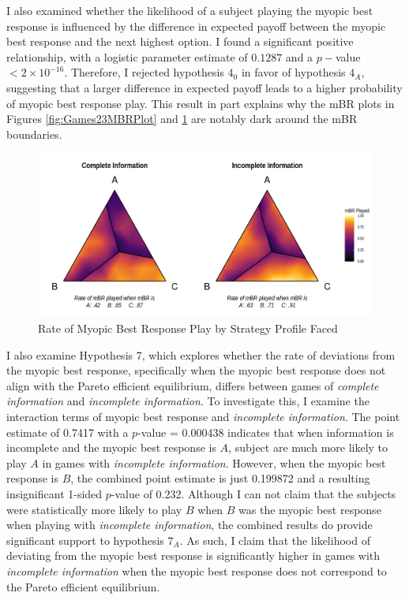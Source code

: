 I also examined whether the likelihood of a subject playing the myopic best response is influenced by the difference in expected payoff between the myopic best response and the next highest option. 
I found a significant positive relationship, with a logistic parameter estimate of 
$0.1287$ and a $p-$value $<2 \times 10^{-16}$. Therefore, I rejected hypothesis $4_0$ in favor of hypothesis $4_A$, suggesting that a larger difference in expected payoff leads to a higher probability of myopic best response play. This result in part explains why the mBR plots in Figures \ref{fig:Games23MBRPlot} and \ref{fig:GamesCIMBRPlot} are notably dark around the mBR boundaries.


\begin{figure}[h]
\captionsetup{justification=centering}
  \caption{Rate of Myopic Best Response Play by Strategy Profile Faced}
   \label{fig:GamesCIMBRPlot}
    \includegraphics[width = \textwidth]{Images/GamesCIMBRPlot.png}
\end{figure}

I also examine Hypothesis 7, which explores whether the rate of deviations from the myopic best response, specifically when the myopic best response does not align with the Pareto efficient equilibrium, differs between games of \textit{complete information} and \textit{incomplete information}. To investigate this, I examine the interaction terms of myopic best response and \textit{incomplete information}. The point estimate of 0.7417 with a $p$-value = 0.000438 indicates that when information is incomplete and the myopic best response is $A$, subject are much more likely to play $A$ in games with \textit{incomplete information}. However, when the myopic best response is $B$, the combined point estimate is just 0.199872 and a resulting insignificant 1-sided $p$-value of 0.232. Although I can not claim that the subjects were statistically more likely to play $B$ when $B$ was the myopic best response when playing with \textit{incomplete information}, the combined results do provide significant support to hypothesis $7_A$. As such, I claim that the likelihood of deviating from the myopic best response is significantly higher in games with \textit{incomplete information} when the myopic best response does not correspond to the Pareto efficient equilibrium.


